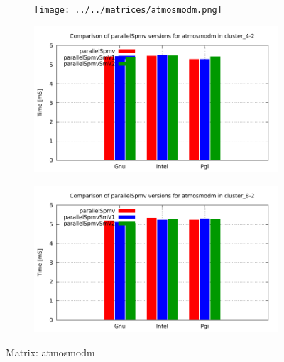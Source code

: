 \begin{figure} [ht!]
    \centering
    \captionsetup{justification=centering, singlelinecheck=false}
    \begin{subfigure}{.25\textwidth}
      \centering
      \hspace*{-1.5cm} 
      \texttt{[image: ../../matrices/atmosmodm.png]}
      \label{fig:atmosmodm_matrix}
    \end{subfigure}%
    \begin{subfigure}{.37\textwidth}
      \centering
      \hspace*{-1.0cm} 
      \includegraphics[page=1, width=0.95\linewidth]{../plots/myCluster_4-2.pdf}
      \label{fig:atmosmodm_performance}
    \end{subfigure}
    \begin{subfigure}{.37\textwidth}
      \centering
      \hspace*{-1.0cm} 
      \includegraphics[page=1, width=0.95\linewidth]{../plots/myCluster_8-2.pdf}
      \label{fig:atmosmodm_performance}
    \end{subfigure}
\caption{Matrix: atmosmodm}
\label{fig:atmosmodm}
\end{figure}


